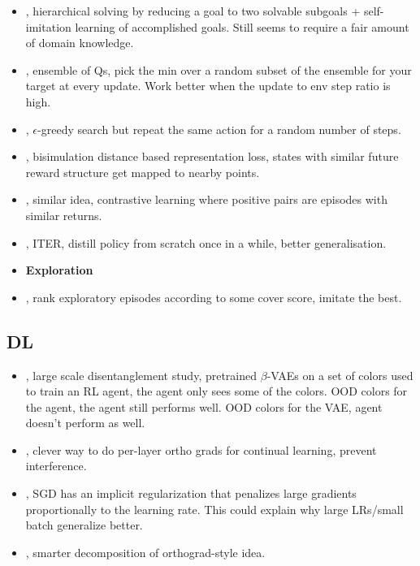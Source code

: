 \begin{itemize}
\item \citet{li2021solving}, hierarchical solving by reducing a goal to two solvable subgoals + self-imitation learning of accomplished goals. Still seems to require a fair amount of domain knowledge.
\item \citet{chen2021randomized}, ensemble of Qs, pick the min over a random subset of the ensemble for your target at every update. Work better when the update to env step ratio is high.
\item \citet{dabney2021temporallyextended}, $\epsilon$-greedy search but repeat the same action for a random number of steps.
\item \citet{zhang2021learning}, bisimulation distance based representation loss, states with similar future reward structure get mapped to nearby points.
  \item \citet{liu2021returnbased}, similar idea, contrastive learning where positive pairs are episodes with similar returns.
\item \citet{igl2021transient}, ITER, distill policy from scratch once in a while, better generalisation.
  
\item \textbf{Exploration}
\item \citet{zha2021rank}, rank exploratory episodes according to some cover score, imitate the best.
\end{itemize}

\subsection{DL}

\begin{itemize}
\item \citet{dittadi2021on}, large scale disentanglement study, pretrained $\beta$-VAEs on a set of colors used to train an RL agent, the agent only sees some of the colors. OOD colors for the agent, the agent still performs well. OOD colors for the VAE, agent doesn't perform as well.
\item \citet{saha2021gradient}, clever way to do per-layer ortho grads for continual learning, prevent interference.
\item \citet{smith2021on}, SGD has an implicit regularization that penalizes large gradients proportionally to the learning rate. This could explain why large LRs/small batch generalize better.
  \item \citet{dery2021auxiliary}, smarter decomposition of orthograd-style idea.
\end{itemize}































